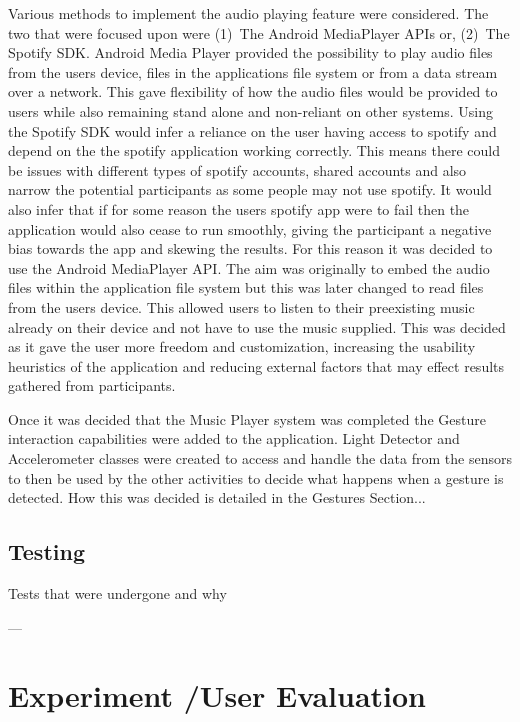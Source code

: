 \documentclass{l4proj}
\begin{document}
Various methods to implement the audio playing feature were considered. The two that were focused upon were (1)~The Android MediaPlayer APIs or, (2)~The Spotify SDK. Android Media Player provided the possibility to play audio files from the users device, files in the applications file system or from a data stream over a network. This gave flexibility of how the audio files would be provided to users while also remaining stand alone and non-reliant on other systems. Using the Spotify SDK would infer a reliance on the user having access to spotify and depend on the the spotify application working correctly. This means there could be issues with different types of spotify accounts, shared accounts and also narrow the potential participants as some people may not use spotify. It would also infer that if for some reason the users spotify app were to fail then the application would also cease to run smoothly, giving the participant a negative bias towards the app and skewing the results. For this reason it was decided to use the Android MediaPlayer API. The aim was originally to embed the audio files within the application file system but this was later changed to read files from the users device. This allowed users to listen to their preexisting music already on their device and not have to use the music supplied. This was decided as it gave the user more freedom and customization, increasing the usability heuristics of the application and reducing external factors that may effect results gathered from participants.

Once it was decided that the Music Player system was completed the Gesture interaction capabilities were added to the application. Light Detector and Accelerometer classes were created to access and handle the data from the sensors to then be used by the other activities to decide what happens when a gesture is detected. How this was decided is detailed in the Gestures Section...

\section{Testing}
Tests that were undergone and why

---



\chapter{Experiment /User Evaluation}
\end{document}
